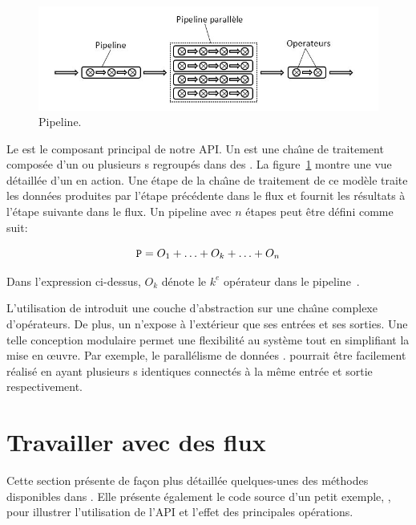 

\begin{figure}[ht]
\centering
     \includegraphics[width=1.0\textwidth]{Figures/Pipeline.jpg}
      \caption{Pipeline.}
       \label{Pipeline.fig}
\end{figure}


Le  est le composant principal de notre {API}. Un  est une cha\^{\i}ne de traitement compos\'ee d'un ou plusieurs s regroup\'es dans des . La figure~\ref{Pipeline.fig} montre une vue d\'etaill\'ee d'un  en action. Une \'etape de la cha\^{\i}ne de traitement de ce mod\`ele traite les donn\'ees produites par l'\'etape pr\'ec\'edente dans le flux et fournit les r\'esultats \`a l'étape suivante dans le flux. Un pipeline  avec $n$ \'etapes peut \^etre d\'efini comme suit:


\[
	{\tt P} = O_1 +  \ldots + O_k + \ldots + O_n
\]


Dans l'expression ci-dessus, $O_k$ d\'enote le $k^e$ op\'erateur dans le pipeline~.

L'utilisation de  introduit une couche d'abstraction sur une cha\^{\i}ne complexe d'op\'erateurs. De plus, un  n'expose à l'ext\'erieur que ses entr\'ees et ses sorties. Une telle conception modulaire permet une flexibilit\'e au syst\`eme tout en simplifiant la mise en œuvre. Par exemple, le parall\'elisme de donn\'ees%
. 
%
 pourrait \^etre facilement r\'ealis\'e en ayant plusieurs s identiques connect\'es \`a la m\^eme entr\'ee et sortie respectivement.


\section{Travailler avec des flux}

Cette section pr\'esente de fa\c{c}on plus d\'etaill\'ee quelques-unes des m\'ethodes disponibles dans \PpFf. Elle pr\'esente \'egalement le code source d'un petit exemple, , pour illustrer l'utilisation de l'API et l'effet des principales op\'erations. 

